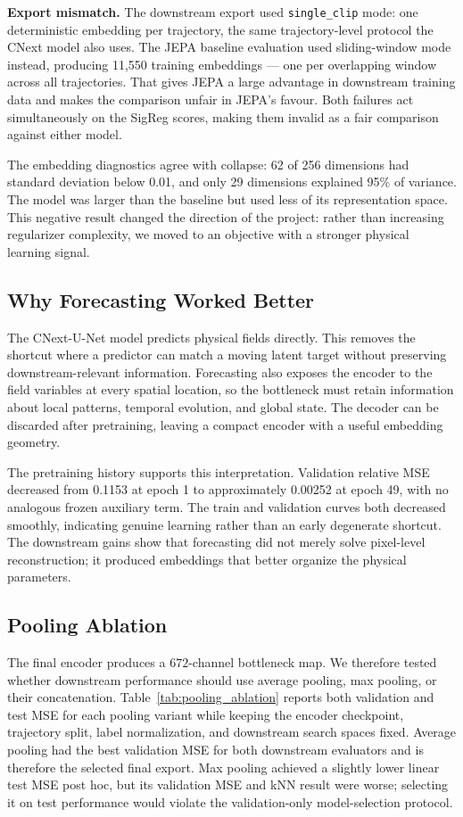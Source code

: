 \documentclass{article}
\begin{document}
\textbf{Export mismatch.} The downstream export used \texttt{single\_clip} mode: one deterministic embedding per trajectory, the same trajectory-level protocol the CNext model also uses. The JEPA baseline evaluation used sliding-window mode instead, producing 11,550 training embeddings --- one per overlapping window across all trajectories. That gives JEPA a large advantage in downstream training data and makes the comparison unfair in JEPA's favour. Both failures act simultaneously on the SigReg scores, making them invalid as a fair comparison against either model.

The embedding diagnostics agree with collapse: 62 of 256 dimensions had standard deviation below 0.01, and only 29 dimensions explained 95\% of variance. The model was larger than the baseline but used less of its representation space. This negative result changed the direction of the project: rather than increasing regularizer complexity, we moved to an objective with a stronger physical learning signal.

\subsection{Why Forecasting Worked Better}

The CNext-U-Net model predicts physical fields directly. This removes the shortcut where a predictor can match a moving latent target without preserving downstream-relevant information. Forecasting also exposes the encoder to the field variables at every spatial location, so the bottleneck must retain information about local patterns, temporal evolution, and global state. The decoder can be discarded after pretraining, leaving a compact encoder with a useful embedding geometry.

The pretraining history supports this interpretation. Validation relative MSE decreased from 0.1153 at epoch 1 to approximately 0.00252 at epoch 49, with no analogous frozen auxiliary term. The train and validation curves both decreased smoothly, indicating genuine learning rather than an early degenerate shortcut. The downstream gains show that forecasting did not merely solve pixel-level reconstruction; it produced embeddings that better organize the physical parameters.

\subsection{Pooling Ablation}

The final encoder produces a $672$-channel bottleneck map. We therefore tested whether downstream performance should use average pooling, max pooling, or their concatenation. Table~\ref{tab:pooling_ablation} reports both validation and test MSE for each pooling variant while keeping the encoder checkpoint, trajectory split, label normalization, and downstream search spaces fixed. Average pooling had the best validation MSE for both downstream evaluators and is therefore the selected final export. Max pooling achieved a slightly lower linear test MSE post hoc, but its validation MSE and kNN result were worse; selecting it on test performance would violate the validation-only model-selection protocol.
\end{document}
